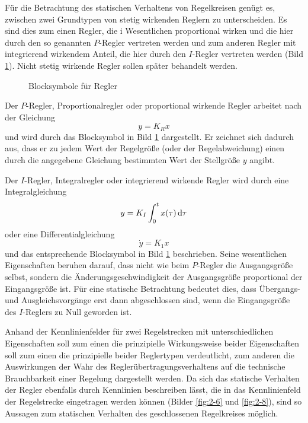 Für die Betrachtung des statischen Verhaltens von Regelkreisen genügt es, zwischen zwei Grundtypen von stetig wirkenden Reglern zu unterscheiden.
Es sind dies zum einen Regler, die i Wesentlichen proportional wirken und die hier durch den so genannten \(P\)-Regler vertreten werden und zum anderen Regler mit integrierend wirkendem Anteil, die hier durch den \(I\)-Regler vertreten werden (Bild \ref{fig:2-5}).
Nicht stetig wirkende Regler sollen später behandelt werden.

\begin{figure}[h]
    \centering
    \caption{Blocksymbole für Regler}
    \label{fig:2-5}
\end{figure}

Der \(P\)-Regler, Proportionalregler oder proportional wirkende Regler arbeitet nach der Gleichung
\begin{equation}
    y = K_R x
\end{equation}
und wird durch das Blocksymbol in Bild \ref{fig:2-5} dargestellt.
Er zeichnet sich dadurch aus, dass er zu jedem Wert der Regelgröße (oder der Regelabweichung) einen durch die angegebene Gleichung bestimmten Wert der Stellgröße \(y\) angibt.

Der \(I\)-Regler, Integralregler oder integrierend wirkende Regler wird durch eine Integralgleichung
\begin{equation}
    y = K_I \int_0^t x\parentheses*{\tau}\d\tau
\end{equation}
oder eine Differentialgleichung
\begin{equation}
    \dot{y} = K_1 x
\end{equation}
und das entsprechende Blocksymbol in Bild \ref{fig:2-5} beschrieben.
Seine wesentlichen Eigenschaften beruhen darauf, dass nicht wie beim \(P\)-Regler die Ausgangsgröße selbst, sondern die Änderungsgeschwindigkeit der Ausgangsgröße proportional der Eingangsgröße ist.
Für eine statische Betrachtung bedeutet dies, dass Übergangs- und Ausgleichsvorgänge erst dann abgeschlossen sind, wenn die Eingangsgröße des \(I\)-Reglers zu Null geworden ist.

Anhand der Kennlinienfelder für zwei Regelstrecken mit unterschiedlichen Eigenschaften soll zum einen die prinzipielle Wirkungsweise beider Eigenschaften soll zum einen die prinzipielle beider Reglertypen verdeutlicht, zum anderen die Auswirkungen  der Wahr des Reglerübertragungsverhaltens auf die technische Brauchbarkeit einer Regelung dargestellt werden.
Da sich das statische Verhalten der Regler ebenfalls durch Kennlinien beschreiben lässt, die in das Kennlinienfeld der Regelstrecke eingetragen werden können (Bilder \ref{fig:2-6} und \ref{fig:2-8}), sind so Aussagen zum statischen Verhalten des geschlossenen Regelkreises möglich.

